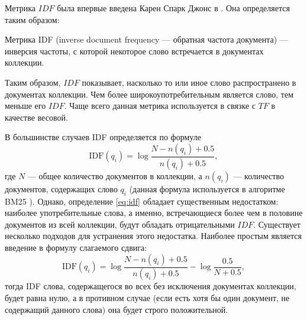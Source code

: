 Метрика $IDF$ была впервые введена Карен Спарк Джонс в \cite{jones2004statistical}. Она определяется таким образом:
\begin{defn}
    Метрика IDF (inverse document frequency --- обратная частота документа) --- инверсия частоты, с которой некоторое слово
    встречается в документах коллекции.
\end{defn}
Таким образом, $IDF$ показывает, насколько то или иное слово распространено в документах коллекции. Чем более широкоупотребительным
является слово, тем меньше его $IDF$. Чаще всего данная метрика используется в связке с $TF$ в качестве весовой.

В большинстве случаев IDF определяется по формуле
\begin{equation}
    \label{eq:idf}
    \text{IDF}(q_i) = \log \frac{N - n(q_i) + 0.5}{n(q_i) + 0.5},
\end{equation}
где $N$ --- общее количество документов в коллекции, а $n(q_i)$ --- количество документов, содержащих слово $q_i$
(данная формула используется в алгоритме BM25 \cite{Amati2009}). Однако, определение \eqref{eq:idf} обладает существенным недостатком:
наиболее употребительные слова, а именно, встречающиеся более чем в половине документов из всей коллекции, будут обладать
отрицательными $IDF$. Существует несколько подходов для устранения этого недостатка. Наиболее простым является введение в формулу
слагаемого сдвига:
\begin{equation}
    \label{eq:shifted-idf}
    \text{IDF}(q_i) = \log \frac{N - n(q_i) + 0.5}{n(q_i) + 0.5} - \log\frac{0.5}{N + 0.5},
\end{equation}
тогда IDF слова, содержащегося во всех без исключения документах коллекции, будет равна нулю, а в противном случае (если есть
хотя бы один документ, не содержащий данного слова) она будет строго положительной.